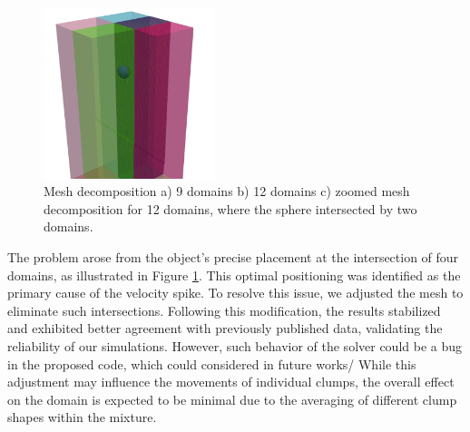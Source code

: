 \begin{figure}[!htp]
\newline
\begin{minipage}{7cm}
\includegraphics[width=5cm]{Images/chap3/decomp12_zoom.png}
\subcaption{}
\end{minipage}
\caption{Mesh decomposition a) 9 domains b) 12 domains c) zoomed mesh decomposition for 12 domains, where the sphere intersected by two domains.}
\label{decompositopn}
\end{figure}

The problem arose from the object's precise placement at the intersection of four domains, as illustrated in Figure \ref{decompositopn}. This optimal positioning was identified as the primary cause of the velocity spike. To resolve this issue, we adjusted the mesh to eliminate such intersections. Following this modification, the results stabilized and exhibited better agreement with previously published data, validating the reliability of our simulations. However, such behavior of the solver could be a bug in the proposed code, which could considered in future works/ While this adjustment may influence the movements of individual clumps, the overall effect on the domain is expected to be minimal due to the averaging of different clump shapes within the mixture.





